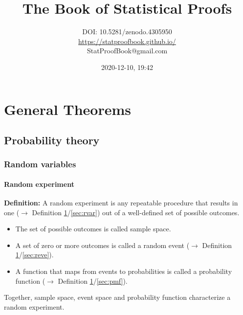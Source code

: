 \documentclass[a4paper,12pt,twoside]{book}
\title{\Huge{The Book of Statistical Proofs}}
\author{DOI: 10.5281/zenodo.4305950 \\ \url{https://statproofbook.github.io/} \\ StatProofBook@gmail.com}
\date{2020-12-10, 19:42}
\begin{document}
\maketitle

\pagebreak
{}
\tableofcontents

\newpage
{}


\chapter{General Theorems} \label{sec:General Theorems} \newpage

\pagebreak
\section{Probability theory}

\subsection{Random variables}

\subsubsection[\textit{Random experiment}]{Random experiment} \label{sec:rexp}
\setcounter{equation}{0}

\textbf{Definition:} A random experiment is any repeatable procedure that results in one ($\rightarrow$ Definition \ref{sec:General Theorems}/\ref{sec:rvar}) out of a well-defined set of possible outcomes.

\begin{itemize}

\item The set of possible outcomes is called sample space.

\item A set of zero or more outcomes is called a random event ($\rightarrow$ Definition \ref{sec:General Theorems}/\ref{sec:reve}).

\item A function that maps from events to probabilities is called a probability function ($\rightarrow$ Definition \ref{sec:General Theorems}/\ref{sec:pmf}).

\end{itemize}

Together, sample space, event space and probability function characterize a random experiment.
\end{document}
